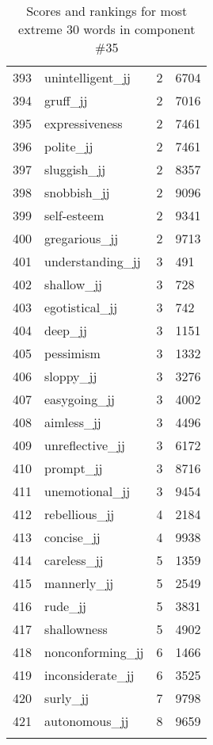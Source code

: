 \begin{longtable}[!htbp]{| rlr@{.}l |}
    393 & unintelligent\_jj & 2 & 6704 \\
    394 & gruff\_jj & 2 & 7016 \\
    395 & expressiveness & 2 & 7461 \\
    396 & polite\_jj & 2 & 7461 \\
    397 & sluggish\_jj & 2 & 8357 \\
    398 & snobbish\_jj & 2 & 9096 \\
    399 & self-esteem & 2 & 9341 \\
    400 & gregarious\_jj & 2 & 9713 \\
    401 & understanding\_jj & 3 & 491 \\
    402 & shallow\_jj & 3 & 728 \\
    403 & egotistical\_jj & 3 & 742 \\
    404 & deep\_jj & 3 & 1151 \\
    405 & pessimism & 3 & 1332 \\
    406 & sloppy\_jj & 3 & 3276 \\
    407 & easygoing\_jj & 3 & 4002 \\
    408 & aimless\_jj & 3 & 4496 \\
    409 & unreflective\_jj & 3 & 6172 \\
    410 & prompt\_jj & 3 & 8716 \\
    411 & unemotional\_jj & 3 & 9454 \\
    412 & rebellious\_jj & 4 & 2184 \\
    413 & concise\_jj & 4 & 9938 \\
    414 & careless\_jj & 5 & 1359 \\
    415 & mannerly\_jj & 5 & 2549 \\
    416 & rude\_jj & 5 & 3831 \\
    417 & shallowness & 5 & 4902 \\
    418 & nonconforming\_jj & 6 & 1466 \\
    419 & inconsiderate\_jj & 6 & 3525 \\
    420 & surly\_jj & 7 & 9798 \\
    421 & autonomous\_jj & 8 & 9659 \\
    \hline
    \caption{Scores and rankings for most extreme 30 words in component \#35} \\
\end{longtable}

